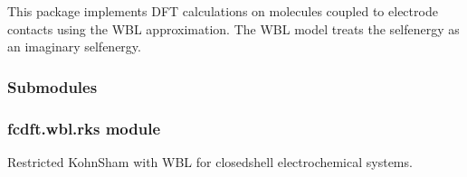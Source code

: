 \documentclass[letterpaper,10pt,english]{sphinxmanual}
\begin{document}
\sphinxAtStartPar
This package implements DFT calculations on molecules coupled to electrode contacts
using the WBL approximation. The WBL model treats the self\sphinxhyphen{}energy as an imaginary self\sphinxhyphen{}energy.


\subsubsection{Submodules}
\label{\detokenize{fcdft.wbl:submodules}}

\subsubsection{fcdft.wbl.rks module}
\label{\detokenize{fcdft.wbl:fcdft-wbl-rks-module}}
\sphinxAtStartPar
Restricted Kohn\sphinxhyphen{}Sham with WBL for closed\sphinxhyphen{}shell electrochemical systems.
\label{\detokenize{fcdft.wbl:module-fcdft.wbl.rks}}
\end{document}
